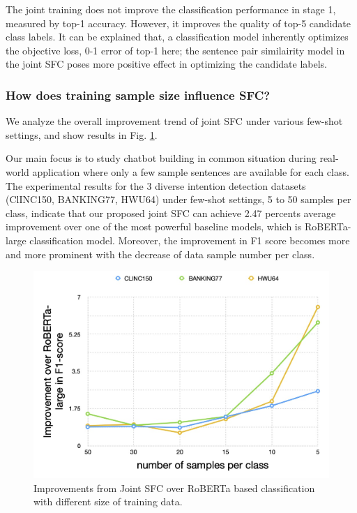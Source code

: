 \documentclass[letterpaper]{article} %
\begin{document}
  The joint training does not improve the classification performance in stage 1,
  measured  by  top-1  accuracy.  However,  it  improves  the  quality of top-5
  candidate  class  labels.  It  can  be  explained that, a classification model
  inherently optimizes the objective loss, 0-1 error of top-1 here; the sentence
  pair similairity model in the joint SFC poses more positive effect in optimizing the 
  candidate labels.


  \subsubsection*{How does training sample size influence SFC?} 
  We analyze the overall  improvement  trend  of  joint SFC under various few-shot
  settings, and show results in Fig. \ref{fig:trend}.

  Our main focus  is  to  study  chatbot  building  in common situation during real-world
  application  where  only  a few sample sentences are available for each class.
  The  experimental  results  for  the  3  diverse  intention detection datasets
  (ClINC150,  BANKING77,  HWU64)  under  few-shot  settings, 5 to 50 samples per
  class,  indicate that our proposed joint SFC can achieve 2.47 percents average
  improvement   over  one  of  the  most  powerful  baseline  models,  which  is
  RoBERTa-large  classification  model.  Moreover,  the  improvement  in F1 score
  becomes  more  and  more prominent with the decrease of data sample number per
  class.

  \begin{figure}[t]
    \begin{centering}
      \includegraphics[scale=0.2]{picture/improvement_trend.jpg} 
      \par
    \end{centering}
    \caption{
      Improvements  from  Joint  SFC  over  RoBERTa  based  classification  with
      different size of training data.
    }
    \label{fig:trend}
  \end{figure}
\end{document}

